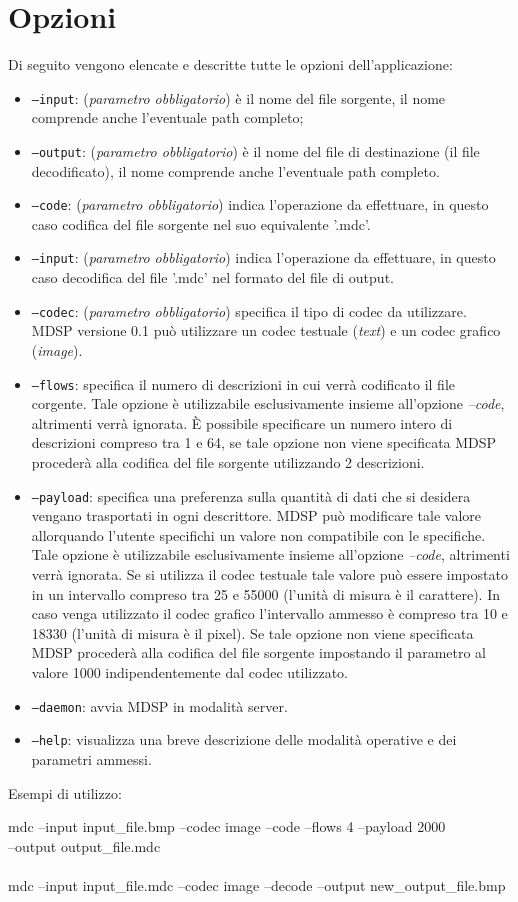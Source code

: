 \section{Opzioni}
\label{sec:opzioni}
Di seguito vengono elencate e descritte tutte le opzioni dell'applicazione:

\begin{itemize}
  \item \texttt{--input}: (\emph{parametro obbligatorio}) è il
  nome del file sorgente, il nome comprende anche l'eventuale path completo;
  \item \texttt{--output}: (\emph{parametro obbligatorio}) è il
  nome del file di destinazione (il file decodificato), il nome comprende anche l'eventuale path
  completo.
  \item \texttt{--code}: (\emph{parametro obbligatorio}) indica
  l'operazione da effettuare, in questo caso codifica del file sorgente nel suo equivalente
  '.mdc'.
  \item \texttt{--input}: (\emph{parametro obbligatorio}) indica
  l'operazione da effettuare, in questo caso decodifica del file '.mdc' nel formato del file di
  output.
  \item \texttt{--codec}: (\emph{parametro obbligatorio}) specifica il tipo di
  codec da utilizzare. MDSP versione 0.1 può utilizzare un codec testuale (\emph{text})
  e un codec grafico (\emph{image}).
  \item \texttt{--flows}: specifica il numero di descrizioni in cui verrà
  codificato il file corgente. Tale opzione è utilizzabile esclusivamente insieme all'opzione
  \emph{--code}, altrimenti verrà ignorata. \`E possibile specificare un numero
  intero di descrizioni compreso tra 1 e 64, se tale opzione non viene
  specificata MDSP procederà alla codifica del file sorgente utilizzando 2
  descrizioni.
  \item \texttt{--payload}: specifica una preferenza sulla quantità di dati che
  si desidera vengano trasportati in ogni descrittore. MDSP può modificare tale
  valore allorquando l'utente specifichi un valore non compatibile con le
  specifiche. Tale opzione è utilizzabile esclusivamente insieme all'opzione
  \emph{--code}, altrimenti verrà ignorata. Se si utilizza il codec testuale
  tale valore può essere impostato in un intervallo compreso tra 25 e 55000
  (l'unità di misura è il carattere). In caso venga utilizzato il codec grafico
  l'intervallo ammesso è compreso tra 10 e 18330 (l'unità di misura è il
  pixel). Se tale opzione non viene
  specificata MDSP procederà alla codifica del file sorgente impostando il
  parametro al valore 1000 indipendentemente dal codec utilizzato.
  \item \texttt{--daemon}: avvia MDSP in modalità server.
  \item \texttt{--help}: visualizza una breve descrizione delle modalità
  operative e dei parametri ammessi.
\end{itemize}

Esempi di utilizzo:

\begin{code}
mdc --input input\_file.bmp --codec image --code --flows 4 --payload
2000\\ --output output\_file.mdc\\\\
mdc --input input\_file.mdc --codec image --decode --output
new\_output\_file.bmp
\end{code}